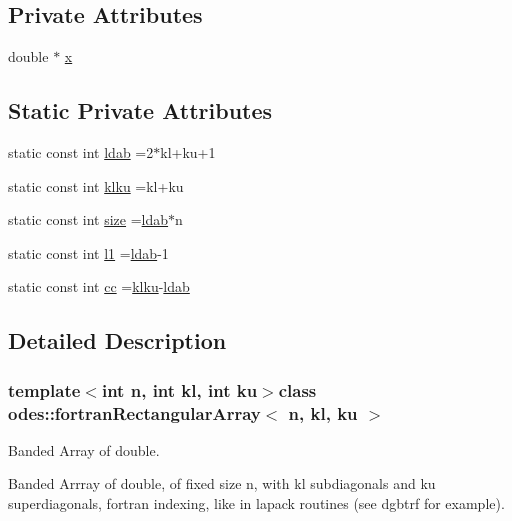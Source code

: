 \subsection*{Private Attributes}
\begin{DoxyCompactItemize}
\item 
double $\ast$ \hyperlink{classodes_1_1fortranRectangularArray_a718a298ef74cd3ba533fc73ad739acc9}{x}
\end{DoxyCompactItemize}
\subsection*{Static Private Attributes}
\begin{DoxyCompactItemize}
\item 
static const int \hyperlink{classodes_1_1fortranRectangularArray_a71e7e0def95610ca1a1bc4c00e65b3cf}{ldab} =2$\ast$kl+ku+1
\item 
static const int \hyperlink{classodes_1_1fortranRectangularArray_afdc8eca52742d938bbe7670769c33818}{klku} =kl+ku
\item 
static const int \hyperlink{classodes_1_1fortranRectangularArray_a4827111315c99a9e0e80e98767fe21e3}{size} =\hyperlink{classodes_1_1fortranRectangularArray_a71e7e0def95610ca1a1bc4c00e65b3cf}{ldab}$\ast$n
\item 
static const int \hyperlink{classodes_1_1fortranRectangularArray_ad1d9e54651da99373857744ddfae77a6}{l1} =\hyperlink{classodes_1_1fortranRectangularArray_a71e7e0def95610ca1a1bc4c00e65b3cf}{ldab}-\/1
\item 
static const int \hyperlink{classodes_1_1fortranRectangularArray_a7a59fad036a553bc9f65842637465cad}{cc} =\hyperlink{classodes_1_1fortranRectangularArray_afdc8eca52742d938bbe7670769c33818}{klku}-\/\hyperlink{classodes_1_1fortranRectangularArray_a71e7e0def95610ca1a1bc4c00e65b3cf}{ldab}
\end{DoxyCompactItemize}


\subsection{Detailed Description}
\subsubsection*{template$<$int n, int kl, int ku$>$class odes\-::fortran\-Rectangular\-Array$<$ n, kl, ku $>$}

Banded Array of double. 

Banded Arrray of double, of fixed size n, with kl subdiagonals and ku superdiagonals, fortran indexing, like in lapack routines (see dgbtrf for example). 

